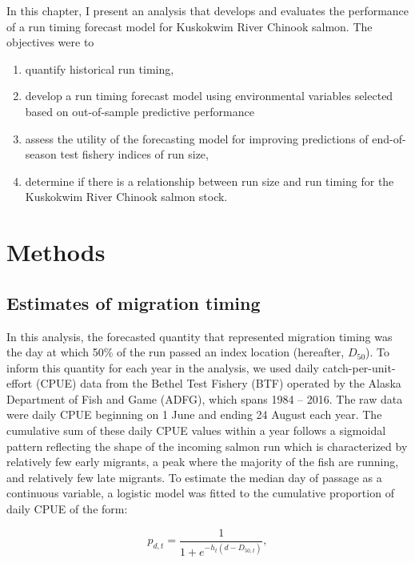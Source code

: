 \documentclass[12pt,]{book}
\providecommand{\tightlist}{%
  \setlength{\itemsep}{0pt}\setlength{\parskip}{0pt}}
\theoremstyle{definition}
\theoremstyle{definition}
\theoremstyle{definition}
\theoremstyle{remark}
\begin{document}
In this chapter, I present an analysis that develops and evaluates the
performance of a run timing forecast model for Kuskokwim River Chinook
salmon. The objectives were to

\begin{enumerate}
\def\labelenumi{\arabic{enumi}.}
\tightlist
\item
  quantify historical run timing,
\item
  develop a run timing forecast model using environmental variables
  selected based on out-of-sample predictive performance
\item
  assess the utility of the forecasting model for improving predictions
  of end-of-season test fishery indices of run size,
\item
  determine if there is a relationship between run size and run timing
  for the Kuskokwim River Chinook salmon stock.
\end{enumerate}

\section{Methods}\label{methods}

\subsection{Estimates of migration
timing}\label{estimates-of-migration-timing}

In this analysis, the forecasted quantity that represented migration
timing was the day at which 50\% of the run passed an index location
(hereafter, \(D_{50}\)). To inform this quantity for each year in the
analysis, we used daily catch-per-unit-effort (CPUE) data from the
Bethel Test Fishery (BTF) operated by the Alaska Department of Fish and
Game (ADFG), which spans 1984 -- 2016. The raw data were daily CPUE
beginning on 1 June and ending 24 August each year. The cumulative sum
of these daily CPUE values within a year follows a sigmoidal pattern
reflecting the shape of the incoming salmon run which is characterized
by relatively few early migrants, a peak where the majority of the fish
are running, and relatively few late migrants. To estimate the median
day of passage as a continuous variable, a logistic model was fitted to
the cumulative proportion of daily CPUE of the form:

\begin{equation}
  p_{d,t}=\frac{1}{1 + e^{-h_t (d - D_{50,t})}},
  \label{eq:logistic}
\end{equation}
\end{document}

